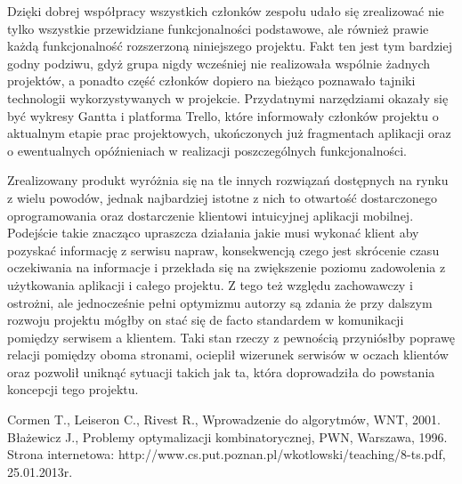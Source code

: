 \documentclass[a4paper,11pt]{article}
\begin{document}
Dzięki dobrej współpracy wszystkich członków zespołu udało się zrealizować nie tylko wszystkie przewidziane funkcjonalności podstawowe, ale również prawie każdą funkcjonalność rozszerzoną niniejszego projektu. Fakt ten jest tym bardziej godny podziwu, gdyż grupa nigdy wcześniej nie realizowała wspólnie żadnych projektów, a ponadto część członków dopiero na bieżąco poznawało tajniki technologii wykorzystywanych w projekcie. Przydatnymi narzędziami okazały się być wykresy Gantta i platforma Trello, które informowały członków projektu o aktualnym etapie prac projektowych, ukończonych już fragmentach aplikacji oraz o ewentualnych opóźnieniach w realizacji poszczególnych funkcjonalności.

Zrealizowany produkt wyróżnia się na tle innych rozwiązań dostępnych na rynku z wielu powodów, jednak najbardziej istotne z nich to otwartość dostarczonego oprogramowania oraz dostarczenie klientowi intuicyjnej aplikacji mobilnej. Podejście takie znacząco upraszcza działania jakie musi wykonać klient aby pozyskać informację z serwisu napraw, konsekwencją czego jest skrócenie czasu oczekiwania na informacje i przekłada się na zwiększenie poziomu zadowolenia z użytkowania aplikacji i całego projektu. Z tego też względu zachowawczy i ostrożni, ale jednocześnie pełni optymizmu autorzy są zdania że przy dalszym rozwoju projektu mógłby on stać się de facto standardem w komunikacji pomiędzy serwisem a klientem. Taki stan rzeczy z pewnością przyniósłby poprawę relacji pomiędzy oboma stronami, ocieplił wizerunek serwisów w oczach klientów oraz pozwolił uniknąć sytuacji takich jak ta, która doprowadziła do powstania koncepcji tego projektu.

\newpage
\listoffigures
{} 
\newpage
\listoftables
{}



\newpage
{}
\begin{thebibliography}{9}
 Cormen T., Leiseron C., Rivest R., Wprowadzenie do algorytmów, WNT, 2001. 
 Błażewicz J., Problemy optymalizacji kombinatorycznej, PWN, Warszawa, 1996.
 Strona internetowa: http://www.cs.put.poznan.pl/wkotlowski/teaching/8-ts.pdf, 25.01.2013r.
\end{thebibliography}
\end{document}
